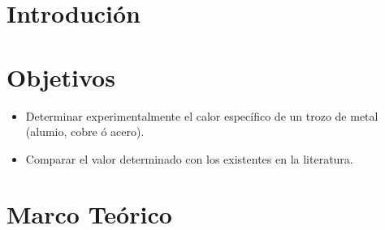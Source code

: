 \documentclass[a4paper, 12p]{article}
\begin{document}
\tableofcontents
\newpage

\section{Introdución}


\section{Objetivos}
\begin{itemize}
      \item Determinar experimentalmente el calor específico de un trozo de metal (alumio, cobre ó acero).
      \item Comparar el valor determinado con los existentes en la literatura.
\end{itemize}



\section{Marco Teórico} 
\end{document}
